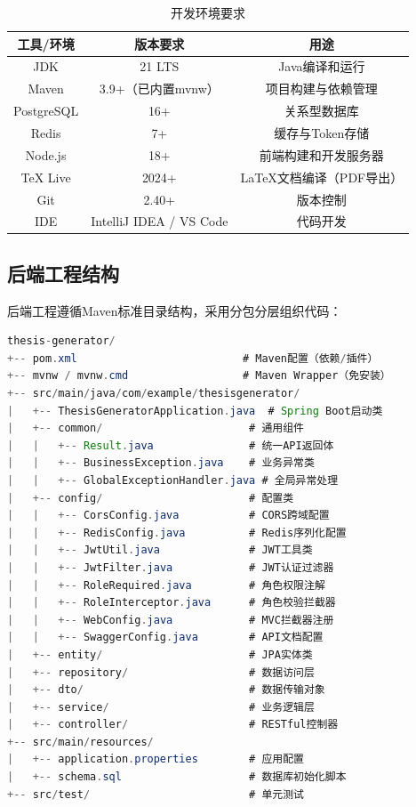 \documentclass{../softeng}
\begin{document}
\begin{table}[htbp]
    \centering
    \caption{开发环境要求}
    \begin{tabular}{|c|c|c|}
        \hline
        \textbf{工具/环境} & \textbf{版本要求} & \textbf{用途} \\
        \hline
        JDK & 21 LTS & Java编译和运行 \\
        \hline
        Maven & 3.9+（已内置mvnw） & 项目构建与依赖管理 \\
        \hline
        PostgreSQL & 16+ & 关系型数据库 \\
        \hline
        Redis & 7+ & 缓存与Token存储 \\
        \hline
        Node.js & 18+ & 前端构建和开发服务器 \\
        \hline
        TeX Live & 2024+ & LaTeX文档编译（PDF导出） \\
        \hline
        Git & 2.40+ & 版本控制 \\
        \hline
        IDE & IntelliJ IDEA / VS Code & 代码开发 \\
        \hline
    \end{tabular}
\end{table}

\subsection{后端工程结构}

后端工程遵循Maven标准目录结构，采用分包分层组织代码：

\begin{lstlisting}[language=Java,caption={后端工程目录结构}]
thesis-generator/
+-- pom.xml                          # Maven配置（依赖/插件）
+-- mvnw / mvnw.cmd                  # Maven Wrapper（免安装）
+-- src/main/java/com/example/thesisgenerator/
|   +-- ThesisGeneratorApplication.java  # Spring Boot启动类
|   +-- common/                       # 通用组件
|   |   +-- Result.java               # 统一API返回体
|   |   +-- BusinessException.java    # 业务异常类
|   |   +-- GlobalExceptionHandler.java # 全局异常处理
|   +-- config/                       # 配置类
|   |   +-- CorsConfig.java           # CORS跨域配置
|   |   +-- RedisConfig.java          # Redis序列化配置
|   |   +-- JwtUtil.java              # JWT工具类
|   |   +-- JwtFilter.java            # JWT认证过滤器
|   |   +-- RoleRequired.java         # 角色权限注解
|   |   +-- RoleInterceptor.java      # 角色校验拦截器
|   |   +-- WebConfig.java            # MVC拦截器注册
|   |   +-- SwaggerConfig.java        # API文档配置
|   +-- entity/                       # JPA实体类
|   +-- repository/                   # 数据访问层
|   +-- dto/                          # 数据传输对象
|   +-- service/                      # 业务逻辑层
|   +-- controller/                   # RESTful控制器
+-- src/main/resources/
|   +-- application.properties        # 应用配置
|   +-- schema.sql                    # 数据库初始化脚本
+-- src/test/                         # 单元测试
\end{lstlisting}
\end{document}
